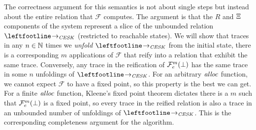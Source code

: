 The correctness argument for this semantics is not about single steps but instead about the entire relation that ${\mathcal F}$ computes.
%
The argument is that the $R$ and $\Xi$ components of the system represent a slice of the unbounded relation $\stepto_{\CESK}$ (restricted to reachable states).
%
We will show that traces in any $n \in {\mathbb N}$ times we \emph{unfold} $\stepto_{\CESK}$ from the initial state, there is a corresponding $m$ applications of ${\mathcal F}$ that reify into a relation that exhibit the same trace.
%
Conversely, any trace in the reification of ${\mathcal F}_{e}^m(\bot)$ has the same trace in some $n$ unfoldings of $\stepto_{\CESK}$.
%
For an arbitrary $\mathit{alloc}$ function, we cannot expect ${\mathcal F}$ to have a fixed point, so this property is the best we can get.
%
For a finite $\mathit{alloc}$ function, Kleene's fixed point theorem dictates there is a $m$ such that ${\mathcal F}_{e}^m(\bot)$ is a fixed point, so every trace in the reified relation is also a trace in an unbounded number of unfoldings of $\stepto_{\CESK}$.
%
This is the corresponding completeness argument for the algorithm.

